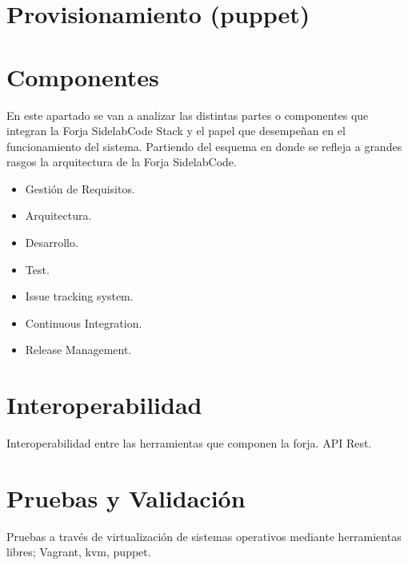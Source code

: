 
\section{Provisionamiento (puppet)}
\label{sec:puppet}


\section{Componentes}
\label{sec:componentes}

\begin{comment}
Componentes, ¿ aquí se definirían las herramientas a instalar ?

Efectivamente, qué herramientas instala la forja (Se supone que las has descrito en la parte de procesos de desarrollo de forma genérica, aquí se dan nombres concretos). 
\end{comment}

\par En este apartado se van a analizar las distintas partes o componentes que integran la Forja SidelabCode Stack y el papel que desempeñan en el funcionamiento del sistema. Partiendo del esquema en donde se refleja a grandes rasgos la arquitectura de la Forja SidelabCode.

\begin{itemize}
	\item Gesti\'on de Requisitos.
	\item Arquitectura.
	\item Desarrollo.
	\item Test.
	\item Issue tracking system.
	\item Continuous Integration.
	\item Release Management.
\end{itemize}


\section{Interoperabilidad}
\label{sec:interoperabilidad}

\par Interoperabilidad entre las herramientas que componen la forja. API Rest.


\section{Pruebas y Validación}
\label{sec:pruebas-validacion}

\par Pruebas a trav\'es de virtualizaci\'on de sistemas operativos mediante herramientas libres; Vagrant, kvm, puppet.

